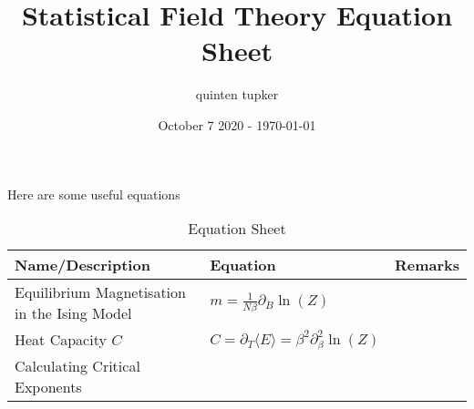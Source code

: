 \documentclass{article}
\title{Statistical Field Theory Equation Sheet}
\author{quinten tupker}
\date{October 7 2020 - \today}
\theoremstyle{definition}
\begin{document}
\maketitle

Here are some useful equations

\begin{table}[H]
  \caption{Equation Sheet}
  \begin{adjustbox}{center}
    \begin{tabular}{|p{5cm}|p{10cm}|p{5cm}|}
      \hline
      \label{equations_1}
      Name/Description & Equation & Remarks \\ \hline
      Equilibrium Magnetisation in the Ising Model & $m = \frac{1}{N \beta} \partial_B \ln(Z)$ & \\ \hline
      Heat Capacity $C$ & $C = \partial_T \langle E \rangle = \beta^2 \partial_\beta^2 \ln(Z)$ & \\ \hline
      Calculating Critical Exponents & & \\ \hline
    \end{tabular}
  \end{adjustbox}
\end{table}
\end{document}
